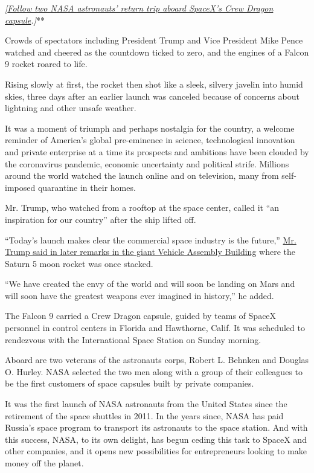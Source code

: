 \emph{\emph{\emph{{[}}\href{https://www.nytimes.com/2020/08/02/science/spacex-nasa-return.html}{\emph{Follow
two NASA astronauts' return trip aboard SpaceX's Crew Dragon
capsule}}}.{]}}**

Crowds of spectators including President Trump and Vice President Mike
Pence watched and cheered as the countdown ticked to zero, and the
engines of a Falcon 9 rocket roared to life.

Rising slowly at first, the rocket then shot like a sleek, silvery
javelin into humid skies, three days after an earlier launch was
canceled because of concerns about lightning and other unsafe weather.

It was a moment of triumph and perhaps nostalgia for the country, a
welcome reminder of America's global pre-eminence in science,
technological innovation and private enterprise at a time its prospects
and ambitions have been clouded by the coronavirus pandemic, economic
uncertainty and political strife. Millions around the world watched the
launch online and on television, many from self-imposed quarantine in
their homes.

Mr. Trump, who watched from a rooftop at the space center, called it
``an inspiration for our country'' after the ship lifted off.

``Today's launch makes clear the commercial space industry is the
future,''
\href{https://www.nytimes.com/2020/05/30/us/politics/trump-spacex-launch.html}{Mr.
Trump said in later remarks in the giant Vehicle Assembly Building}
where the Saturn 5 moon rocket was once stacked.

``We have created the envy of the world and will soon be landing on Mars
and will soon have the greatest weapons ever imagined in history,'' he
added.

The Falcon 9 carried a Crew Dragon capsule, guided by teams of SpaceX
personnel in control centers in Florida and Hawthorne, Calif. It was
scheduled to rendezvous with the International Space Station on Sunday
morning.

Aboard are two veterans of the astronauts corps, Robert L. Behnken and
Douglas O. Hurley. NASA selected the two men along with a group of their
colleagues to be the first customers of space capsules built by private
companies.

It was the first launch of NASA astronauts from the United States since
the retirement of the space shuttles in 2011. In the years since, NASA
has paid Russia's space program to transport its astronauts to the space
station. And with this success, NASA, to its own delight, has begun
ceding this task to SpaceX and other companies, and it opens new
possibilities for entrepreneurs looking to make money off the planet.

